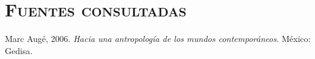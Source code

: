 \documentclass[14pt,letterpaper,twoside]{extbook} %
\begin{document}


\chapter*{\centering\mdseries\Large\textsc{Fuentes consultadas}}
\pagestyle{fancy}
\fancyhf{}
\fancyfoot[RO,LE]{\hfill \thepage \hfill}
%
\noindent Marc Augé, 2006. \textit{Hacia una antropología de los mundos contemporáneos}. México: Gedisa. \\ 
\end{document}
